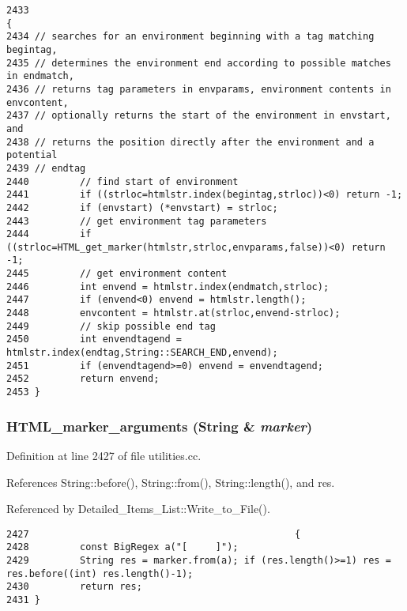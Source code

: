 \footnotesize\begin{verbatim}2433                                                                                                                                                                                                              {
2434 // searches for an environment beginning with a tag matching begintag,
2435 // determines the environment end according to possible matches in endmatch,
2436 // returns tag parameters in envparams, environment contents in envcontent,
2437 // optionally returns the start of the environment in envstart, and
2438 // returns the position directly after the environment and a potential
2439 // endtag
2440         // find start of environment
2441         if ((strloc=htmlstr.index(begintag,strloc))<0) return -1;
2442         if (envstart) (*envstart) = strloc;
2443         // get environment tag parameters
2444         if ((strloc=HTML_get_marker(htmlstr,strloc,envparams,false))<0) return -1;
2445         // get environment content
2446         int envend = htmlstr.index(endmatch,strloc);
2447         if (envend<0) envend = htmlstr.length();
2448         envcontent = htmlstr.at(strloc,envend-strloc);
2449         // skip possible end tag
2450         int envendtagend = htmlstr.index(endtag,String::SEARCH_END,envend);
2451         if (envendtagend>=0) envend = envendtagend;
2452         return envend;
2453 }
\end{verbatim}\normalsize 
{}
\subsubsection{ HTML\_\-marker\_\-arguments ({\bf String} \& {\em marker})}\label{utilities_8cc_a52}




Definition at line 2427 of file utilities.cc.

References String::before(), String::from(), String::length(), and res.

Referenced by Detailed\_\-Items\_\-List::Write\_\-to\_\-File().



\footnotesize\begin{verbatim}2427                                               {
2428         const BigRegex a("[     ]");
2429         String res = marker.from(a); if (res.length()>=1) res = res.before((int) res.length()-1);
2430         return res;
2431 }
\end{verbatim}\normalsize 
{}
